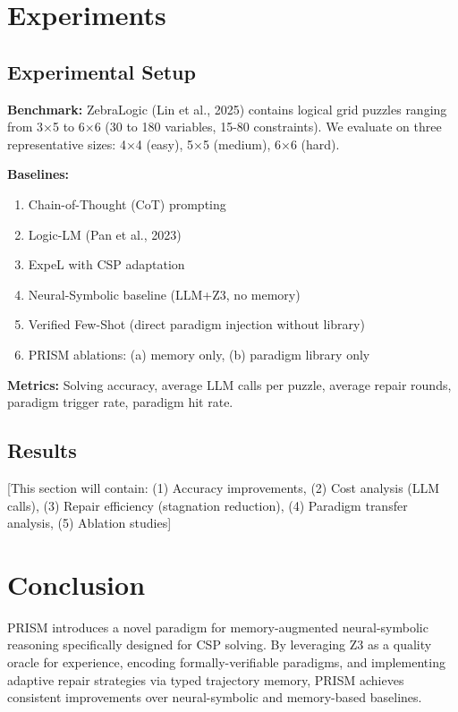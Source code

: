 \documentclass[letterpaper]{article}
\begin{document}
\section{Experiments}

\subsection{Experimental Setup}

\textbf{Benchmark:} ZebraLogic (Lin et al., 2025) contains logical grid puzzles ranging from 3×5 to 6×6 (30 to 180 variables, 15-80 constraints). We evaluate on three representative sizes: 4×4 (easy), 5×5 (medium), 6×6 (hard).

\textbf{Baselines:}
\begin{enumerate}
    \item Chain-of-Thought (CoT) prompting
    \item Logic-LM (Pan et al., 2023)
    \item ExpeL with CSP adaptation
    \item Neural-Symbolic baseline (LLM+Z3, no memory)
    \item Verified Few-Shot (direct paradigm injection without library)
    \item PRISM ablations: (a) memory only, (b) paradigm library only
\end{enumerate}

\textbf{Metrics:} Solving accuracy, average LLM calls per puzzle, average repair rounds, paradigm trigger rate, paradigm hit rate.

\subsection{Results}

[This section will contain: (1) Accuracy improvements, (2) Cost analysis (LLM calls), (3) Repair efficiency (stagnation reduction), (4) Paradigm transfer analysis, (5) Ablation studies]

\section{Conclusion}

PRISM introduces a novel paradigm for memory-augmented neural-symbolic reasoning specifically designed for CSP solving. By leveraging Z3 as a quality oracle for experience, encoding formally-verifiable paradigms, and implementing adaptive repair strategies via typed trajectory memory, PRISM achieves consistent improvements over neural-symbolic and memory-based baselines.
\end{document}
